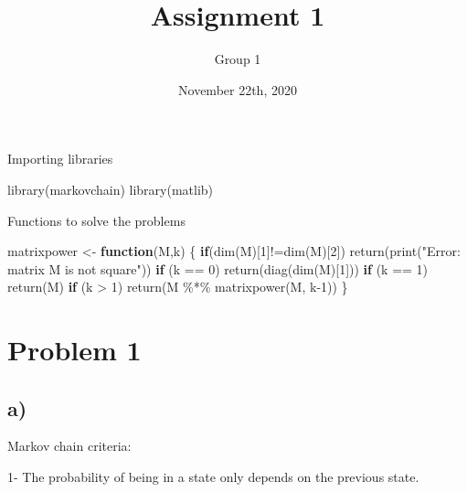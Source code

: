 \documentclass[
]{article}
\title{Assignment 1}
\author{Group 1}
\date{November 22th, 2020}
\newenvironment{Shaded}{\begin{snugshade}}{\end{snugshade}}
\newcommand{\ControlFlowTok}[1]{\textcolor[rgb]{0.13,0.29,0.53}{\textbf{#1}}}
\newcommand{\DecValTok}[1]{\textcolor[rgb]{0.00,0.00,0.81}{#1}}
\newcommand{\FunctionTok}[1]{\textcolor[rgb]{0.00,0.00,0.00}{#1}}
\newcommand{\NormalTok}[1]{#1}
\newcommand{\OtherTok}[1]{\textcolor[rgb]{0.56,0.35,0.01}{#1}}
\newcommand{\SpecialCharTok}[1]{\textcolor[rgb]{0.00,0.00,0.00}{#1}}
\newcommand{\StringTok}[1]{\textcolor[rgb]{0.31,0.60,0.02}{#1}}
\begin{document}
\maketitle

Importing libraries

\begin{Shaded}
\begin{Highlighting}[]
\FunctionTok{library}\NormalTok{(markovchain)}
\FunctionTok{library}\NormalTok{(matlib)}
\end{Highlighting}
\end{Shaded}

Functions to solve the problems

\begin{Shaded}
\begin{Highlighting}[]
\NormalTok{matrixpower }\OtherTok{\textless{}{-}} \ControlFlowTok{function}\NormalTok{(M,k) \{}
  \ControlFlowTok{if}\NormalTok{(}\FunctionTok{dim}\NormalTok{(M)[}\DecValTok{1}\NormalTok{]}\SpecialCharTok{!=}\FunctionTok{dim}\NormalTok{(M)[}\DecValTok{2}\NormalTok{]) }\FunctionTok{return}\NormalTok{(}\FunctionTok{print}\NormalTok{(}\StringTok{"Error: matrix M is not square"}\NormalTok{))}
  \ControlFlowTok{if}\NormalTok{ (k }\SpecialCharTok{==} \DecValTok{0}\NormalTok{) }\FunctionTok{return}\NormalTok{(}\FunctionTok{diag}\NormalTok{(}\FunctionTok{dim}\NormalTok{(M)[}\DecValTok{1}\NormalTok{])) }
  \ControlFlowTok{if}\NormalTok{ (k }\SpecialCharTok{==} \DecValTok{1}\NormalTok{) }\FunctionTok{return}\NormalTok{(M)}
  \ControlFlowTok{if}\NormalTok{ (k }\SpecialCharTok{\textgreater{}} \DecValTok{1}\NormalTok{)  }\FunctionTok{return}\NormalTok{(M }\SpecialCharTok{\%*\%} \FunctionTok{matrixpower}\NormalTok{(M, k}\DecValTok{{-}1}\NormalTok{))}
\NormalTok{\}}
\end{Highlighting}
\end{Shaded}

\hypertarget{problem-1}{%
\section{Problem 1}\label{problem-1}}

\hypertarget{a}{%
\subsection{a)}\label{a}}

Markov chain criteria:

1- The probability of being in a state only depends on the previous
state.
\end{document}
